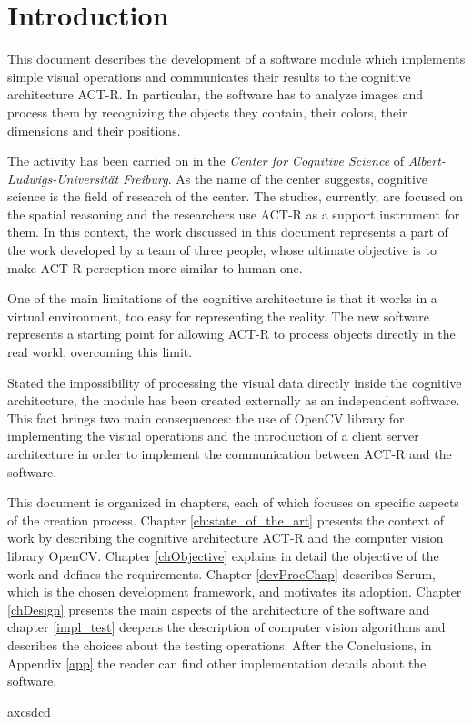 \chapter{Introduction}
	This document describes the development of a software module which implements simple visual operations and communicates their results to the cognitive architecture \mbox{ACT-R}.
	In particular, the software has to analyze images and process them by recognizing the objects they contain, their colors, their dimensions and their positions.
	

	The activity has been carried on in the \emph{Center for Cognitive Science} of \emph{Albert-Ludwigs-Universität Freiburg}. 
	As the name of the center suggests, cognitive science is the field of research of the center.
	The studies, currently, are focused on the spatial reasoning and the researchers use \mbox{ACT-R} as a support instrument for them. 
	In this context, the work discussed in this document represents a part of the work developed by a team of three people, whose ultimate objective is to make \mbox{ACT-R} perception more similar to human one.

	One of the main limitations of the cognitive architecture is that it works in a virtual environment, too easy for representing the reality. 
	The new software represents a starting point for allowing \mbox{ACT-R} to process objects directly in the real world, overcoming this limit.
	
	Stated the impossibility of processing the visual data directly inside the cognitive architecture, the module has been created externally as an independent software.
	This fact brings two main consequences: the use of OpenCV library for implementing the visual operations and the introduction of a client server architecture in order to implement the communication between \mbox{ACT-R} and the software.

	
	This document is organized in chapters, each of which focuses on specific aspects of the creation process.
	Chapter \ref{ch:state_of_the_art} presents the context of work by describing the cognitive architecture \mbox{ACT-R} and the computer vision library \mbox{OpenCV}.
	Chapter \ref{chObjective} explains in detail the objective of the work and defines the requirements.
	Chapter \ref{devProcChap} describes Scrum, which is the chosen development framework, and motivates its adoption.%
	Chapter \ref{chDesign} presents the main aspects of the architecture of the software and chapter \ref{impl_test} deepens the description of computer vision algorithms and describes the choices about the testing operations.
	After the Conclusions, in Appendix \ref{app} the reader can find other implementation details about the software.

	
	
	
	
	axcsdcd
	

 	
	
